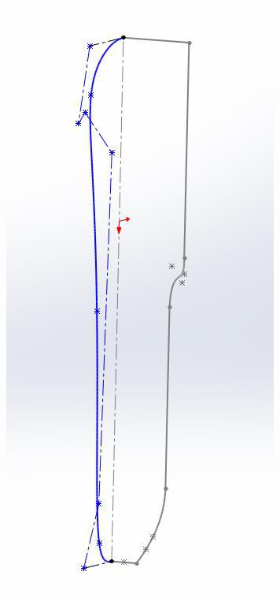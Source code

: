 \begin{figure}[!htbp]
\begin{subfigure}{.45\linewidth}
            \end{subfigure}
            \hfill
            \begin{subfigure}[m]{.45\linewidth}
                \centering
                \includegraphics[width=\linewidth]{assets/conception1/img228.jpg}
            \end{subfigure}
        \end{figure}  
        

